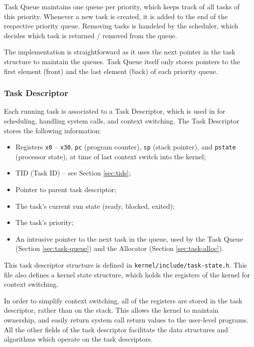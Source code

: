 \documentclass[12pt]{article}
\begin{document}
    Task Queue maintains one queue per priority, which keeps track of all tasks of this priority.
    Whenever a new task is created, it is added to the end of the respective priority queue.
    Removing tasks is handeled by the scheduler, which decides which task is returned / removed from the queue.

    The implementation is straightforward as it uses the next pointer in the task structure to maintain the queues.
    Task Queue itself only stores pointers to the first element (\= front) and the last element (\= back) of each priority queue.

    \subsubsection{Task Descriptor}

    Each running task is associated to a Task Descriptor, which is used in for scheduling, handling system calls, and context switching. The Task Descriptor stores the following information:
    \begin{itemize}
        \item Registers \verb`x0` -- \verb`x30`, \verb`pc` (program counter), \verb`sp` (stack pointer), and \verb`pstate` (processor state), at time of last context switch into the kernel;
        \item TID (Task ID) -- see Section \ref{sec:tids};
        \item Pointer to parent task descriptor;
        \item The task's current run state (ready, blocked, exited);
        \item The task's priority;
        \item An intrusive pointer to the next task in the queue, used by the Task Queue (Section \ref{sec:task-queue}) and the Allocator (Section \ref{sec:task-alloc}).
    \end{itemize}
    This task descriptor structure is defined in \verb`kernel/include/task-state.h`. This file also defines a kernel state structure, which holds the registers of the kernel for context switching.

    In order to simplify context switching, all of the registers are stored in the task descriptor, rather than on the stack. This allows the kernel to maintain ownership, and easily return system call return values to the user-level programs. All the other fields of the task descriptor facilitate the data structures and algorithms which operate on the task descriptors.
\end{document}
